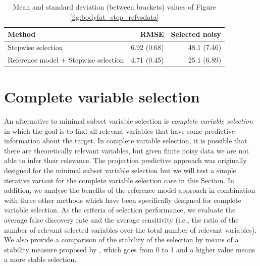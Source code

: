 \documentclass[a4]{article}
\theoremstyle{definition}
\begin{document}
\begin{table}[tp]
\footnotesize
\centering
\begin{tabular}{l|r|r}
Method & RMSE & Selected noisy \\ 
  \hline
Stepwise selection & 6.92 (0.68) & 48.1 (7.46)    \\
Reference model + Stepwise selection & 4.71 (0.45) & 25.1 (6.89)   \\
\end{tabular}
\caption{Mean and standard deviation (between brackets) values of Figure \ref{fig:bodyfat_step_refvsdata}}
\label{tab:step_refvsdata}
\end{table}

\section{Complete variable selection}\label{comparison-complete-subset}
\label{complete-selection}

An alternative to minimal subset variable selection is \emph{complete
  variable selection} in which the goal is to find all relevant
variables that have some predictive information about the target. In
complete variable selection, it is possible that there are theoretically
relevant variables, but given finite noisy data we are not able to infer their relevance.
The projection predictive approach was originally designed for the minimal subset
variable selection but we will test a simple iterative variant for the complete
variable selection case in this Section.
 In addition, we analyse the benefits of the reference
model approach in combination with three other
methods which have been specifically designed for complete variable selection. 
As the criteria of selection performance, we evaluate the average false
discovery rate and the average
sensitivity (i.e., the ratio of the number of relevant selected
variables over the total number of relevant variables). We also provide
a comparison of the stability of the selection by means of a stability
measure proposed by \citet{paper:stability}, which goes from 0 to 1 and a higher value 
means a more stable selection. 

\end{document}
